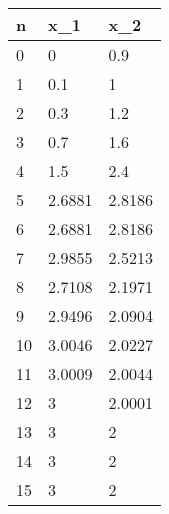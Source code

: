 \begin{tabular}{lll}
n & x_{1} & x_{2} \\ 
\hline 
0 & 0 & 0.9 \\ 
1 & 0.1 & 1 \\ 
2 & 0.3 & 1.2 \\ 
3 & 0.7 & 1.6 \\ 
4 & 1.5 & 2.4 \\ 
5 & 2.6881 & 2.8186 \\ 
6 & 2.6881 & 2.8186 \\ 
7 & 2.9855 & 2.5213 \\ 
8 & 2.7108 & 2.1971 \\ 
9 & 2.9496 & 2.0904 \\ 
10 & 3.0046 & 2.0227 \\ 
11 & 3.0009 & 2.0044 \\ 
12 & 3 & 2.0001 \\ 
13 & 3 & 2 \\ 
14 & 3 & 2 \\ 
15 & 3 & 2 \\ 
\hline 
\end{tabular}